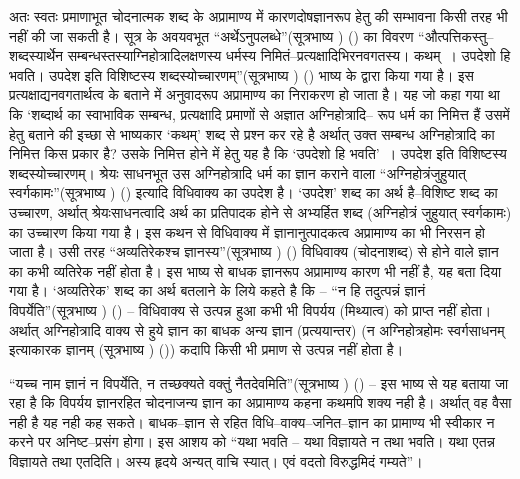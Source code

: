 अतः स्वतः प्रमाणाभूत चोदनात्मक शब्द के अप्रामाण्य में कारणदोषज्ञानरूप हेतु की सम्भावना किसी तरह भी नहीं की जा सकती है। सूत्र के अवयवभूत “अर्थेऽनुपलब्धे”(सूत्रभाष्य ) () का विवरण “औत्पत्तिकस्तु–शब्दस्यार्थेन सम्बन्धस्तस्याग्निहोत्रादिलक्षणस्य धर्मस्य निमितं–प्रत्यक्षादिभिरनवगतस्य। कथम्~। उपदेशो हि भवति। उपदेश इति विशिष्टस्य शब्दस्योच्चारणम्”(सूत्रभाष्य ) () भाष्य के द्वारा किया गया है। इस प्रत्यक्षाद्यनवगतार्थत्व के बताने में अनुवादरूप अप्रामाण्य का निराकरण हो जाता है। यह जो कहा गया था कि ‘शब्दार्थ का स्वाभाविक सम्बन्ध, प्रत्यक्षादि प्रमाणों से अज्ञात अग्निहोत्रादि– रूप धर्म का निमित्त हैं उसमें हेतु बताने की इच्छा से भाष्यकार ‘कथम्' शब्द से प्रश्न कर रहे है अर्थात् उक्त सम्बन्ध अग्निहोत्रादि का निमित्त किस प्रकार है? उसके निमित्त होने में हेतु यह है कि ‘उपदेशो हि भवति'~। उपदेश इति विशिष्टस्य शब्दस्योच्चारणम्। श्रेयः साधनभूत उस अग्निहोत्रादि धर्म का ज्ञान कराने वाला “अग्निहोत्रंजुहुयात् स्वर्गकामः”(सूत्रभाष्य ) () इत्यादि विधिवाक्य का उपदेश है। ‘उपदेश' शब्द का अर्थ है–विशिष्ट शब्द का उच्चारण, अर्थात् श्रेयःसाधनत्वादि अर्थ का प्रतिपादक होने से अभ्यर्हित शब्द (अग्निहोत्रं जुहुयात् स्वर्गकामः) का उच्चारण किया गया है। इस कथन से विधिवाक्य में ज्ञानानुत्पादकत्व अप्रामाण्य का भी निरसन हो जाता है। उसी तरह “अव्यतिरेकश्च ज्ञानस्य”(सूत्रभाष्य ) () विधिवाक्य (चोदनाशब्द) से होने वाले ज्ञान का कभी व्यतिरेक नहीं होता है। इस भाष्य से बाधक ज्ञानरूप अप्रामाण्य कारण भी नहीं है, यह बता दिया गया है। ‘अव्यतिरेक' शब्द का अर्थ बतलाने के लिये कहते है कि – “न हि तदुत्पन्नं ज्ञानं विपर्येति”(सूत्रभाष्य ) () – विधिवाक्य से उत्पन्न हुआ कभी भी विपर्यय (मिथ्यात्व) को प्राप्त नहीं होता। अर्थात् अग्निहोत्रादि वाक्य से हुये ज्ञान का बाधक अन्य ज्ञान (प्रत्ययान्तर) (न अग्निहोत्रहोमः स्वर्गसाधनम् इत्याकारक ज्ञानम् (सूत्रभाष्य ) ()) कदापि किसी भी प्रमाण से उत्पन्न नहीं होता है। 

“यच्च नाम ज्ञानं न विपर्येति, न तच्छक्यते वक्तुं नैतदेवमिति”(सूत्रभाष्य ) () – इस भाष्य से यह बताया जा रहा है कि विपर्यय ज्ञानरहित चोदनाजन्य ज्ञान का अप्रामाण्य कहना कथमपि शक्य नही है। अर्थात् वह वैसा नही है यह नही कह सकते। बाधक–ज्ञान से रहित विधि–वाक्य–जनित–ज्ञान का प्रामाण्य भी स्वीकार न करने पर अनिष्ट–प्रसंग होगा। इस आशय को “यथा भवति – यथा विज्ञायते न तथा भवति। यथा एतन्न विज्ञायते तथा एतदिति। अस्य हृदये अन्यत् वाचि स्यात्। एवं वदतो विरुद्धमिदं गम्यते”।

